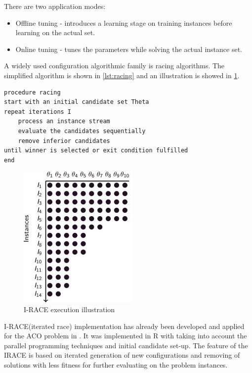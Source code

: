 \documentclass[12pt]{article}
\begin{document}
There are two application modes:
\begin{itemize}
\item Offline tuning - introduces a learning stage on training instances before learning on the actual set.
\item Online tuning - tunes the parameters while solving the actual instance set.
\end{itemize}

A widely used configuration algorithmic family is racing algorithms. The simplified algorithm is shown in \ref{lst:racing} and an illustration is showed in \ref{fig:irace}.


\begin{minipage}[c, breaklines=true]{0.95\textwidth}
\begin{lstlisting}[caption={General racing pseudo-code}, label={lst:racing}]
procedure racing
start with an initial candidate set Theta
repeat iterations I
	process an instance stream
	evaluate the candidates sequentially
	remove inferior candidates
until winner is selected or exit condition fulfilled
end
\end{lstlisting}
\end{minipage}

\begin{figure}[H]
  \centering
    \includegraphics[scale=1.2]{irace.jpg}
  \caption{I-RACE execution illustration}
  \label{fig:irace}
\end{figure}


I-RACE(iterated race) implementation has already been developed and applied for the ACO problem in \cite{iraceaac}. It was implemented in R with taking into account the parallel programming techniques and initial candidate set-up. The feature of the IRACE is based on iterated generation of new configurations and removing of solutions with less fitness for further evaluating on the problem instances.
\end{document}
